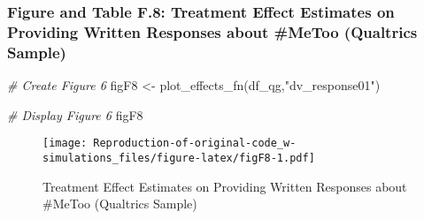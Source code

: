 \documentclass[
]{article}
\newenvironment{Shaded}{\begin{snugshade}}{\end{snugshade}}
\newcommand{\CommentTok}[1]{\textcolor[rgb]{0.56,0.35,0.01}{\textit{#1}}}
\newcommand{\FunctionTok}[1]{\textcolor[rgb]{0.00,0.00,0.00}{#1}}
\newcommand{\NormalTok}[1]{#1}
\newcommand{\OtherTok}[1]{\textcolor[rgb]{0.56,0.35,0.01}{#1}}
\newcommand{\SpecialCharTok}[1]{\textcolor[rgb]{0.00,0.00,0.00}{#1}}
\newcommand{\StringTok}[1]{\textcolor[rgb]{0.31,0.60,0.02}{#1}}
\begin{document}
\hypertarget{figure-and-table-f.8-treatment-effect-estimates-on-providing-written-responses-about-metoo-qualtrics-sample}{%
\subsubsection{Figure and Table F.8: Treatment Effect Estimates on
Providing Written Responses about \#MeToo (Qualtrics
Sample)}\label{figure-and-table-f.8-treatment-effect-estimates-on-providing-written-responses-about-metoo-qualtrics-sample}}

\begin{Shaded}
\begin{Highlighting}[]
\CommentTok{\# Create Figure 6}
\NormalTok{figF8 }\OtherTok{\textless{}{-}} \FunctionTok{plot\_effects\_fn}\NormalTok{(df\_qg,}\StringTok{"dv\_response01"}\NormalTok{) }

\CommentTok{\# Display Figure 6}
\NormalTok{figF8 }
\end{Highlighting}
\end{Shaded}

\begin{figure}
\centering
\texttt{[image: Reproduction-of-original-code\_w-simulations\_files/figure-latex/figF8-1.pdf]}
\caption{Treatment Effect Estimates on Providing Written Responses about
\#MeToo (Qualtrics Sample)}
\end{figure}

\begin{Shaded}
\end{Shaded}
\end{document}
